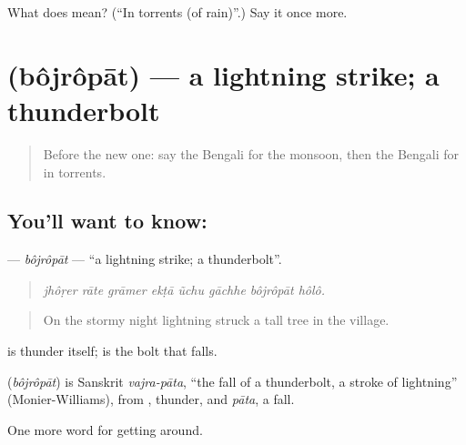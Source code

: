 \begin{tcolorbox}[breakable,colback=teal!4,colframe=teal!35!black,title={Before you move on}]
What does  mean? (\textquotedblleft{}In torrents (of rain)\textquotedblright{}.) Say it once more.
\end{tcolorbox}
\section[\texorpdfstring{\bn{বজ্রপাত} (bôjrôpāt)}{বজ্রপাত (bôjrôpāt)}]{ (bôjrôpāt) — a lightning strike; a thunderbolt}

\label{lesson:BN-C425-bojropat}



\begin{quote}
Before the new one: say the Bengali for the monsoon, then the Bengali for in torrents.
\end{quote}

\subsection*{You'll want to know: }
\textbf{} — \emph{bôjrôpāt} — \textquotedblleft{}a lightning strike; a thunderbolt\textquotedblright{}.

\begin{quote}
       
\end{quote}

\begin{quote}
\emph{jhôṛer rāte grāmer ekṭā ũchu gāchhe bôjrôpāt hôlô.}
\end{quote}

\begin{quote}
On the stormy night lightning struck a tall tree in the village.
\end{quote}

 is thunder itself;  is the bolt that falls.

\begin{cousinweb}
\textbf{} (\emph{bôjrôpāt}) is Sanskrit \emph{vajra-pāta}, \textquotedblleft{}the fall of a thunderbolt, a stroke of lightning\textquotedblright{} (Monier-Williams), from \textbf{}, thunder, and \emph{pāta}, a fall.
\end{cousinweb}

\begin{grammarlens}[title={What you've built}]
One more word for getting around.
\end{grammarlens}

